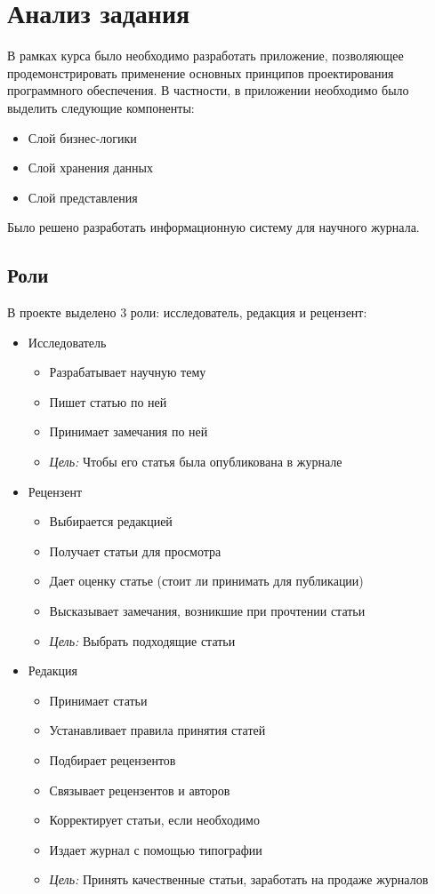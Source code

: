\section{Анализ задания}
В рамках курса было необходимо разработать приложение, позволяющее продемонстрировать применение основных принципов проектирования программного обеспечения. В частности, в приложении необходимо было выделить следующие компоненты:

\begin{itemize}
\item Слой бизнес-логики
\item Слой хранения данных
\item Слой представления
\end{itemize}

Было решено разработать информационную систему для научного журнала.

\subsection{Роли}

В проекте выделено 3 роли: исследователь, редакция и рецензент:

\begin{itemize}
\item Исследователь

\begin{itemize}
\item Разрабатывает научную тему
\item Пишет статью по ней
\item Принимает замечания по ней
\item \textit{Цель:} Чтобы его статья была опубликована в журнале
\end{itemize}
\item Рецензент

\begin{itemize}
\item Выбирается редакцией
\item Получает статьи для просмотра
\item Дает оценку статье (стоит ли принимать для публикации)
\item Высказывает замечания, возникшие при прочтении статьи
\item \textit{Цель:} Выбрать подходящие статьи
\end{itemize}
\item Редакция

\begin{itemize}
\item Принимает статьи
\item Устанавливает правила принятия статей
\item Подбирает рецензентов
\item Связывает рецензентов и авторов
\item Корректирует статьи, если необходимо
\item Издает журнал с помощью типографии
\item \textit{Цель:} Принять качественные статьи, заработать на продаже журналов
\end{itemize}
\end{itemize}

